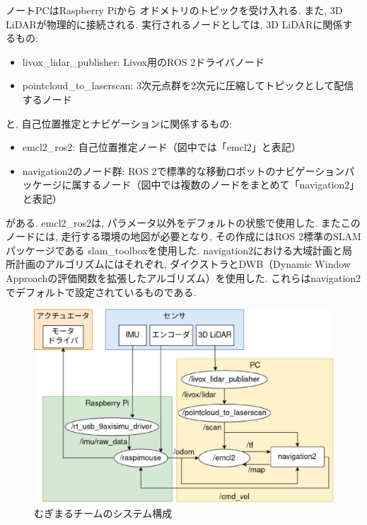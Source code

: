 ノートPCはRaspberry Piから
オドメトリのトピックを受け入れる. 
また, 3D LiDARが物理的に接続される. 
実行されるノードとしては, 3D LiDARに関係するもの: 
\begin{itemize}
	\item livox\_lidar\_publisher: Livox用のROS 2ドライバノード
	\item pointcloud\_to\_laserscan: 3次元点群を2次元に圧縮してトピックとして配信するノード
\end{itemize}
と, 自己位置推定とナビゲーションに関係するもの: 
\begin{itemize}
	\item emcl2\_ros2: 自己位置推定ノード（図中では「emcl2」と表記）
	\item navigation2\cite{nav2}のノード群: ROS 2で標準的な移動ロボットのナビゲーションパッケージに属するノード（図中では複数のノードをまとめて「navigation2」と表記）
\end{itemize}
がある. 
emcl2\_ros2は, パラメータ以外をデフォルトの状態で使用した. 
またこのノードには, 走行する環境の地図が必要となり, 
その作成にはROS 2標準のSLAMパッケージである
slam\_toolbox\cite{slam_toolbox}を使用した. 
navigation2における大域計画と局所計画のアルゴリズムにはそれぞれ, 
ダイクストラ\cite{dijkstra}とDWB（Dynamic Window Approach\cite{dwa}の評価関数を拡張したアルゴリズム）を使用した. 
これらはnavigation2でデフォルトで設定されているものである. 


\begin{figure}[h]
  \begin{center}
    \includegraphics[width=1.0\linewidth]{figs/mugimaru_system_2024.eps}
    \caption{むぎまるチームのシステム構成}
    \label{fig:mugimaru_system}
  \end{center}
\end{figure}


